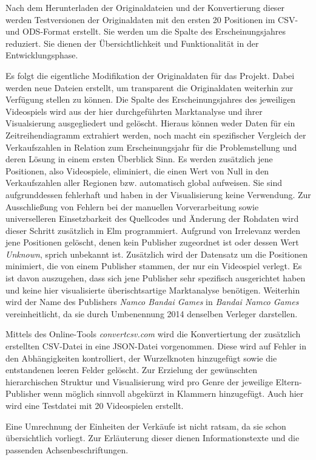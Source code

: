 \documentclass[usegeometry=true]{scrartcl}
\begin{document}
Nach dem Herunterladen der Originaldateien und der Konvertierung dieser werden Testversionen der Originaldaten mit den ersten 20 Positionen im CSV- und ODS-Format erstellt.
Sie werden um die Spalte des Erscheinungsjahres reduziert.
Sie dienen der Übersichtlichkeit und Funktionalität in der Entwicklungsphase.

Es folgt die eigentliche Modifikation der Originaldaten für das Projekt.
Dabei werden neue Dateien erstellt, um transparent die Originaldaten weiterhin zur Verfügung stellen zu können.
Die Spalte des Erscheinungsjahres des jeweiligen Videospiels wird aus der hier durchgeführten Marktanalyse und ihrer Visualsierung ausgegliedert und gelöscht. 
Hieraus können weder Daten für ein Zeitreihendiagramm extrahiert werden, noch macht ein spezifischer Vergleich der Verkaufszahlen in Relation zum Erscheinungsjahr für die Problemstellung und deren Lösung in einem ersten Überblick Sinn. 
Es werden zusätzlich jene Positionen, also Videospiele, eliminiert, die einen Wert von Null in den Verkaufszahlen aller Regionen bzw. automatisch global aufweisen. 
Sie sind aufgrunddessen fehlerhaft und haben in der Visualisierung keine Verwendung. 
Zur Ausschließung von Fehlern bei der manuellen Vorverarbeitung sowie universelleren Einsetzbarkeit des Quellcodes und Änderung der Rohdaten wird dieser Schritt zusätzlich in Elm programmiert.
Aufgrund von Irrelevanz werden jene Positionen gelöscht, denen kein Publisher zugeordnet ist oder dessen Wert \textit{Unknown}, sprich unbekannt ist. 
Zusätzlich wird der Datensatz um die Positionen minimiert, die von einem Publisher stammen, der nur ein Videospiel verlegt. 
Es ist davon auszugehen, dass sich jene Publisher sehr spezifisch ausgerichtet haben und keine hier visualisierte überischtsartige Marktanalyse benötigen.
Weiterhin wird der Name des Publishers \textit{Namco Bandai Games} in \textit{Bandai Namco Games} vereinheitlicht, da sie durch Umbenennung 2014 denselben Verleger darstellen. 

Mittels des Online-Tools \textit{convertcsv.com} wird die Konvertiertung der zusätzlich erstellten CSV-Datei in eine JSON-Datei vorgenommen.
Diese wird auf Fehler in den Abhängigkeiten kontrolliert, der Wurzelknoten hinzugefügt sowie die entstandenen leeren Felder gelöscht. 
Zur Erzielung der gewünschten hierarchischen Struktur und Visualisierung wird pro Genre der jeweilige Eltern-Publisher wenn möglich sinnvoll abgekürzt in Klammern hinzugefügt. 
Auch hier wird eine Testdatei mit 20 Videospielen erstellt.

Eine Umrechnung der Einheiten der Verkäufe ist nicht ratsam, da sie schon übersichtlich vorliegt. 
Zur Erläuterung dieser dienen Informationstexte und die passenden Achsenbeschriftungen.
\end{document}
